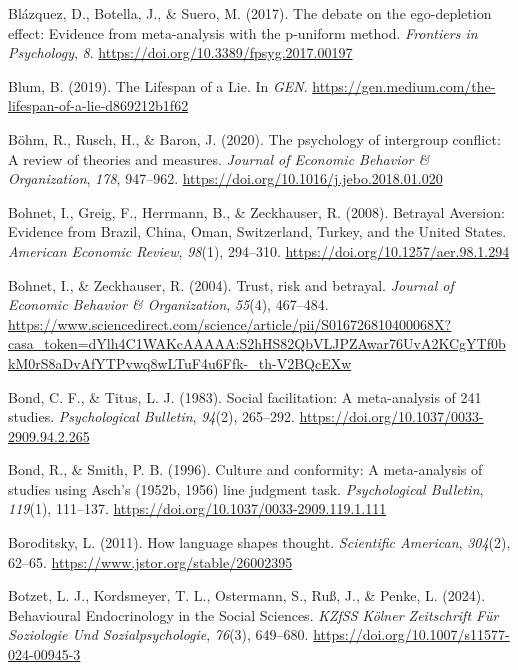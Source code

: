 \documentclass[
  letterpaper,
]{book}
\newlength{\cslhangindent}
\newenvironment{CSLReferences}[2] %
 {\begin{list}{}{%
  \setlength{\itemindent}{0pt}
  \setlength{\leftmargin}{0pt}
  \setlength{\parsep}{0pt}
  \ifodd #1
   \setlength{\leftmargin}{\cslhangindent}
   \setlength{\itemindent}{-1\cslhangindent}
  \fi
  \setlength{\itemsep}{#2\baselineskip}}}
 {\end{list}}
\begin{document}
\begin{CSLReferences}{1}{0}
Blázquez, D., Botella, J., \& Suero, M. (2017). The debate on the
ego-depletion effect: Evidence from meta-analysis with the p-uniform
method. \emph{Frontiers in Psychology}, \emph{8}.
\url{https://doi.org/10.3389/fpsyg.2017.00197}

Blum, B. (2019). The {Lifespan} of a {Lie}. In \emph{GEN}.
\url{https://gen.medium.com/the-lifespan-of-a-lie-d869212b1f62}

Böhm, R., Rusch, H., \& Baron, J. (2020). The psychology of intergroup
conflict: {A} review of theories and measures. \emph{Journal of Economic
Behavior \& Organization}, \emph{178}, 947--962.
\url{https://doi.org/10.1016/j.jebo.2018.01.020}

Bohnet, I., Greig, F., Herrmann, B., \& Zeckhauser, R. (2008). Betrayal
{Aversion}: {Evidence} from {Brazil}, {China}, {Oman}, {Switzerland},
{Turkey}, and the {United} {States}. \emph{American Economic Review},
\emph{98}(1), 294--310. \url{https://doi.org/10.1257/aer.98.1.294}

Bohnet, I., \& Zeckhauser, R. (2004). Trust, risk and betrayal.
\emph{Journal of Economic Behavior \& Organization}, \emph{55}(4),
467--484.
\url{https://www.sciencedirect.com/science/article/pii/S016726810400068X?casa_token=dYlh4C1WAKcAAAAA:S2hHS82QbVLJPZAwar76UvA2KCgYTf0bkM0rS8aDvAfYTPvwq8wLTuF4u6Ffk-_th-V2BQcEXw}

Bond, C. F., \& Titus, L. J. (1983). Social facilitation: A
meta-analysis of 241 studies. \emph{Psychological Bulletin},
\emph{94}(2), 265--292. \url{https://doi.org/10.1037/0033-2909.94.2.265}

Bond, R., \& Smith, P. B. (1996). Culture and conformity: {A}
meta-analysis of studies using {Asch}'s (1952b, 1956) line judgment
task. \emph{Psychological Bulletin}, \emph{119}(1), 111--137.
\url{https://doi.org/10.1037/0033-2909.119.1.111}

Boroditsky, L. (2011). How language shapes thought. \emph{Scientific
American}, \emph{304}(2), 62--65.
\url{https://www.jstor.org/stable/26002395}

Botzet, L. J., Kordsmeyer, T. L., Ostermann, S., Ruß, J., \& Penke, L.
(2024). Behavioural {Endocrinology} in the {Social} {Sciences}.
\emph{KZfSS Kölner Zeitschrift Für Soziologie Und Sozialpsychologie},
\emph{76}(3), 649--680. \url{https://doi.org/10.1007/s11577-024-00945-3}


\end{CSLReferences}
\end{document}
